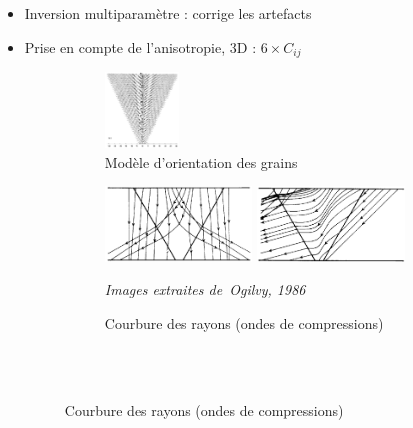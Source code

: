 \subsection*{}
\begin{frame}{\insertsectionhead}
\setlength{\leftmargin}{-1cm}
\setlength{\rightmargin}{-1cm}

	\begin{itemize}
		\item<1-> Inversion multiparamètre : corrige les artefacts
		\item<2-> Prise en compte de l'anisotropie, 3D : $6 \times C_{ij}$
		\begin{figure}[!h]
		    \centering
		    \hspace{-1cm}\begin{subfigure}[b]{0.25\textwidth}
		    	\centering
		 		\includegraphics[height=2cm]{img/ogilvy_model.png}
		 		\vspace{0.2cm}\caption{\centering \scriptsize Modèle d'orientation des grains}
			\end{subfigure}
			\begin{subfigure}[b]{0.7\textwidth}
				\centering
		 		\includegraphics[height=2cm]{img/ogilvy_ray1.png}
		 		\includegraphics[height=2cm]{img/ogilvy_ray2.png}\\
		 		\raggedright{\vspace{-0.25cm}\tiny{\itshape Images extraites de~Ogilvy, 1986}}
		 		\caption{\scriptsize Courbure des rayons (ondes de compressions) \\~}
			\end{subfigure}\\
				

\end{figure}
\end{itemize}
\end{frame}
